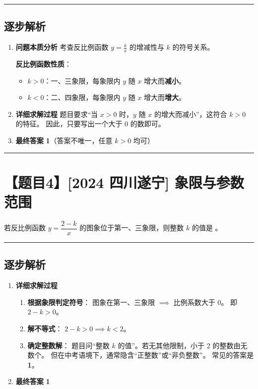 \documentclass[UTF8]{ctexart}
\newenvironment{redenv}{\color{red}}{}
\newenvironment{detailedanalysis}{%
    \color{red}
    \begin{enumerate}[label=\textbf{第\arabic*步：}, leftmargin=*, align=left, itemsep=1.5ex]
}{%
    \end{enumerate}
}
\newenvironment{conceptbox}{%
    \begin{tcolorbox}[colback=red!5, colframe=red!50!black, title=概念解析, fonttitle=\bfseries]
}{%
    \end{tcolorbox}
}
\newcommand{\problemrule}{\noindent\rule{\textwidth}{1.5pt}\vspace{-0.8em}}
\newcommand{\analysisrule}{\noindent\rule{\textwidth}{0.8pt}\vspace{-0.8em}}
\begin{document}
\begin{redenv}
\analysisrule
\subsection*{逐步解析}

\begin{detailedanalysis}
\item \textbf{问题本质分析}
考查反比例函数 $y=\frac{k}{x}$ 的增减性与 $k$ 的符号关系。
\begin{conceptbox}
\textbf{反比例函数性质}：
\begin{itemize}
    \item $k>0$：一、三象限，每象限内 $y$ 随 $x$ 增大而\textbf{减小}。
    \item $k<0$：二、四象限，每象限内 $y$ 随 $x$ 增大而\textbf{增大}。
\end{itemize}
\end{conceptbox}

\item \textbf{详细求解过程}
题目要求“当 $x>0$ 时，$y$ 随 $x$ 的增大而减小”，这符合 $k>0$ 的特征。
因此，只要写出一个大于 0 的数即可。

\item \textbf{最终答案}
\textbf{1}（答案不唯一，任意 $k>0$ 均可）
\end{detailedanalysis}
\end{redenv}

\problemrule
\section*{【题目4】[2024 四川遂宁] 象限与参数范围}
若反比例函数 $y=\dfrac{2-k}{x}$ 的图象位于第一、三象限，则整数 $k$ 的值是 \underline{\hspace{2cm}}。

\begin{redenv}
\analysisrule
\subsection*{逐步解析}

\begin{detailedanalysis}
\item \textbf{详细求解过程}
\begin{enumerate}[label=\textbf{Step \arabic*.}]
    \item \textbf{根据象限判定符号}：
    图象在第一、三象限 $\implies$ 比例系数大于 0。
    即 $2-k > 0$。

    \item \textbf{解不等式}：
    $2-k > 0 \implies k < 2$。

    \item \textbf{确定整数解}：
    题目问“整数 $k$ 的值”。若无其他限制，小于 2 的整数由无数个。
    但在中考语境下，通常隐含“正整数”或“非负整数”。
    常见的答案是 \textbf{1}。
\end{enumerate}

\item \textbf{最终答案}
\textbf{1}
\end{detailedanalysis}
\end{redenv}
\end{document}

